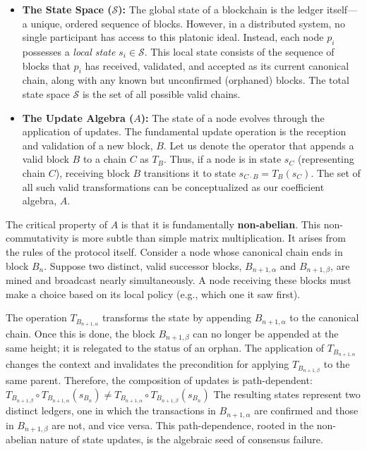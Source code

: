 \documentclass[
]{article}
\begin{document}
\begin{itemize}
\item
  \textbf{The State Space (\(\mathcal{S}\)):} The global state of a
  blockchain is the ledger itself---a unique, ordered sequence of
  blocks. However, in a distributed system, no single participant has
  access to this platonic ideal. Instead, each node \(p_i\) possesses a
  \emph{local state} \(s_i \in \mathcal{S}\). This local state consists
  of the sequence of blocks that \(p_i\) has received, validated, and
  accepted as its current canonical chain, along with any known but
  unconfirmed (orphaned) blocks. The total state space \(\mathcal{S}\)
  is the set of all possible valid chains.
\item
  \textbf{The Update Algebra (\(A\)):} The state of a node evolves
  through the application of updates. The fundamental update operation
  is the reception and validation of a new block, \(B\). Let us denote
  the operator that appends a valid block \(B\) to a chain \(C\) as
  \(T_B\). Thus, if a node is in state \(s_C\) (representing chain
  \(C\)), receiving block \(B\) transitions it to state
  \(s_{C \cdot B} = T_B(s_C)\). The set of all such valid
  transformations can be conceptualized as our coefficient algebra,
  \(A\).
\end{itemize}

The critical property of \(A\) is that it is fundamentally
\textbf{non-abelian}. This non-commutativity is more subtle than simple
matrix multiplication. It arises from the rules of the protocol itself.
Consider a node whose canonical chain ends in block \(B_n\). Suppose two
distinct, valid successor blocks, \(B_{n+1, \alpha}\) and
\(B_{n+1, \beta}\), are mined and broadcast nearly simultaneously. A
node receiving these blocks must make a choice based on its local policy
(e.g., which one it saw first).

The operation \(T_{B_{n+1, \alpha}}\) transforms the state by appending
\(B_{n+1, \alpha}\) to the canonical chain. Once this is done, the block
\(B_{n+1, \beta}\) can no longer be appended at the same height; it is
relegated to the status of an orphan. The application of
\(T_{B_{n+1, \alpha}}\) changes the context and invalidates the
precondition for applying \(T_{B_{n+1, \beta}}\) to the same parent.
Therefore, the composition of updates is path-dependent:
\(T_{B_{n+1, \beta}} \circ T_{B_{n+1, \alpha}}(s_{B_n}) \neq T_{B_{n+1, \alpha}} \circ T_{B_{n+1, \beta}}(s_{B_n})\)
The resulting states represent two distinct ledgers, one in which the
transactions in \(B_{n+1, \alpha}\) are confirmed and those in
\(B_{n+1, \beta}\) are not, and vice versa. This path-dependence, rooted
in the non-abelian nature of state updates, is the algebraic seed of
consensus failure.
\end{document}

